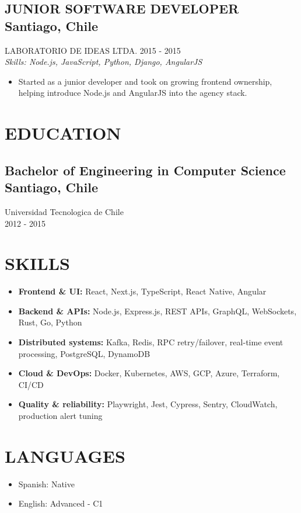 \documentclass{article}
\newcommand{\SubHeading}[1]{
   \subsection*{#1}\vspace{-0.5em}
}
\newcommand{\WorkExperience}[2]{
   \subsection*{#1}
   \vspace{-1em}
   \uppercase{#2}
}
\newcommand{\Skills}[1]{
   \textit{Skills: #1}
}
\begin{document}
\WorkExperience{JUNIOR SOFTWARE DEVELOPER \hfill Santiago, Chile}{Laboratorio de Ideas Ltda. \hfill 2015 {-} 2015} \\
\Skills{Node.js, JavaScript, Python, Django, AngularJS}
\begin{itemize}
\item Started as a junior developer and took on growing frontend ownership, helping introduce Node.js and AngularJS into the agency stack.
\end{itemize}

\section*{EDUCATION}
\SubHeading{Bachelor of Engineering in Computer Science \hfill Santiago, Chile}
Universidad Tecnologica de Chile \\[0.1em]
2012 {-} 2015

\section*{SKILLS}
\begin{itemize}
	\item \textbf{Frontend \& UI:} React, Next.js, TypeScript, React Native, Angular
	\item \textbf{Backend \& APIs:} Node.js, Express.js, REST APIs, GraphQL, WebSockets, Rust, Go, Python
	\item \textbf{Distributed systems:} Kafka, Redis, RPC retry/failover, real-time event processing, PostgreSQL, DynamoDB
	\item \textbf{Cloud \& DevOps:} Docker, Kubernetes, AWS, GCP, Azure, Terraform, CI/CD
	\item \textbf{Quality \& reliability:} Playwright, Jest, Cypress, Sentry, CloudWatch, production alert tuning
\end{itemize}

\section*{LANGUAGES}
\begin{itemize}[left=0pt]
	\item Spanish: Native
	\item English: Advanced {-} C1
\end{itemize}
\end{document}
